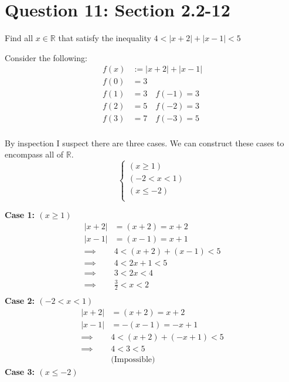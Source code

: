 \documentclass[11pt]{article}
\theoremstyle{plain}
\begin{document}
\section*{Question 11: Section 2.2-12}
\begin{center}
	Find all $x \in \mathbb{R}$ that satisfy the inequality $4<|x+2|+|x-1|<5$
\end{center}
Consider the following:
\[
	\begin{aligned}
		f(x) & := |x+2|+|x-1|      \\
		f(0) & = 3                 \\
		f(1) & = 3 \quad f(-1) = 3 \\
		f(2) & = 5 \quad f(-2) = 3 \\
		f(3) & = 7 \quad f(-3) = 5 \\
	\end{aligned}
\]
\begin{blockquote}
	By inspection I suspect there are three cases. We can construct these cases to encompass all of $\mathbb{R}$.
	\[
		\begin{cases}
			(x \geq  1)  \\
			(-2 < x < 1) \\
			(x \leq -2)  \\
		\end{cases}
	\]
\end{blockquote} \noindent
\textbf{Case 1: $(x \geq  1)$}  \\
\[
	\begin{aligned}
		|x+2|    & = (x+2) = x+2       \\
		|x-1|    & = (x-1) = x+1       \\
		\implies & 4 < (x+2)+(x-1) < 5 \\
		\implies & 4 < 2x+1 < 5        \\
		\implies & 3 < 2x < 4          \\
		\implies & \frac{3}{2} < x < 2 \\
	\end{aligned}
\]
\textbf{Case 2: $(-2 < x < 1)$} \\
\[
	\begin{aligned}
		|x+2|    & = (x+2) = x+2        \\
		|x-1|    & = -(x-1) = -x+1      \\
		\implies & 4 < (x+2)+(-x+1) < 5 \\
		\implies & 4 < 3 < 5            \\
		         & \text{(Impossible)}
	\end{aligned}
\]
\textbf{Case 3: $(x \leq -2)$}  \\
\end{document}
